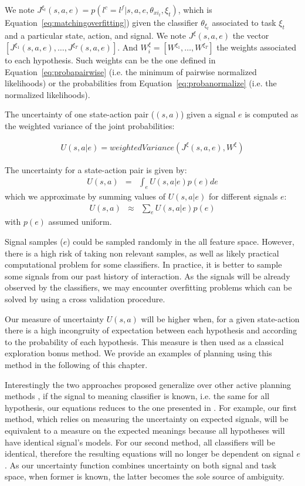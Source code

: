 We note $J^{\xi_t}(s,a,e) = p(l^c = l^f | s, a, e, \theta_{xi_t}, \xi_t)$, which is Equation~\ref{eq:matchingoverfitting}) given the classifier $\theta_{\xi_t}$ associated to task $\xi_t$ and a particular state, action, and signal. We note $J^{\xi}(s,a,e)$ the vector $[J^{\xi_1}(s,a,e), \ldots, J^{\xi_T}(s,a,e)]$. And $W_{i}^{\xi} = [W^{\xi_1}, \ldots, W^{\xi_T}]$ the weights associated to each hypothesis. Such weights can be the one defined in Equation~\ref{eq:probapairwise} (i.e. the minimum of pairwise normalized likelihoods) or the probabilities from Equation~\ref{eq:probanormalize} (i.e. the normalized likelihoods).

The uncertainty of one state-action pair ($(s,a)$) given a signal $e$ is computed as the weighted variance of the joint probabilities:

\begin{eqnarray}
U(s,a|e) = weightedVariance(J^{\xi}(s,a,e), W^{\xi})
\label{eq:planningOneSignal}
\end{eqnarray}

The uncertainty for a state-action pair is given by:
\begin{eqnarray}
U(s,a) & = & \int_{e} U(s,a|e) p(e) de
\end{eqnarray}
which we approximate by summing values of $U(s,a|e)$ for different signals $e$:
\begin{eqnarray}
U(s,a) & \approx & \sum_{e} U(s,a|e) p(e)
\label{eq:planning}
\end{eqnarray}
with $p(e)$ assumed uniform.

Signal samples ($e$) could be sampled randomly in the all feature space. However, there is a high risk of taking non relevant samples, as well as likely practical computational problem for some classifiers. In practice, it is better to sample some signals from our past history of interaction. As the signals will be already observed by the classifiers, we may encounter overfitting problems which can be solved by using a cross validation procedure.

Our measure of uncertainty $U(s,a)$ will be higher when, for a given state-action there is a high incongruity of expectation between each hypothesis and according to the probability of each hypothesis. This measure is then used as a classical exploration bonus method. We provide an examples of planning using this method in the following of this chapter.

\transition

Interestingly the two approaches proposed generalize over other active planning methods \cite{macl09airl}, if the signal to meaning classifier is known, i.e. the same for all hypothesis, our equations reduces to the one presented in \cite{macl11simul}. For example, our first method, which relies on measuring the uncertainty on expected signals, will be equivalent to a measure on the expected meanings because all hypotheses will have identical signal's models. For our second method, all classifiers will be identical, therefore the resulting equations will no longer be dependent on signal $e$. As our uncertainty function combines uncertainty on both signal and task space, when former is known, the latter becomes the sole source of ambiguity.

